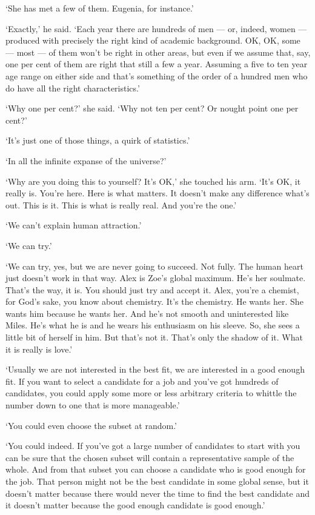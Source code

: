 `She has met a few of them. Eugenia, for instance.'

`Exactly,' he said. `Each year there are hundreds of men --- or, indeed, women --- produced with precisely the right kind of academic background. OK, OK, some --- most --- of them won't be right in other areas, but even if we assume that, say, one per cent of them {\twelveit are\/} right that still a few a year. Assuming a five to ten year age range on either side and that's something of the order of a hundred men who do have all the right characteristics.'

`Why one per cent?' she said. `Why not ten per cent? Or nought point one per cent?'

`It's just one of those things, a quirk of statistics.'

`In all the infinite expanse of the universe?'

`Why are you doing this to yourself? It's OK,' she touched his arm.
`It's OK, it really is. You're here. Here is what matters. It
doesn't make any difference what's out. This is it. This is what is
really real. And you're the one.'

`We can't explain human attraction.'

`We can try.'

`We can try, yes, but we are never going to succeed. Not fully. The
human heart just doesn't work in that way. Alex is Zoe's global
maximum. He's her soulmate. That's the way, it is. You should just
try and accept it. Alex, you're a chemist, for God's sake, you know
about chemistry. It's the chemistry. He wants her. She wants him
because he wants her. And he's not smooth and uninterested like
Miles. He's what he is and he wears his enthusiasm on his sleeve.
So, she sees a little bit of herself in him. But that's not it.
That's only the shadow of it. What it is really is {\twelveit
love\/}.'

`Usually we are not interested in the best fit, we are interested in a good enough fit. If you want to select a candidate for a job and you've got hundreds of candidates, you could apply some more or less arbitrary criteria to whittle the number down to one that is more manageable.'

`You could even choose the subset at random.'

`You could indeed. If you've got a large number of candidates to start with you can be sure that the chosen subset will contain a representative sample of the whole. And from that subset you can choose a candidate who is good enough for the job. That person might not be the {\twelveit best\/} candidate in some global sense, but it doesn't matter because there would never the time to find the best candidate and it doesn't matter because the good enough candidate is good enough.'

